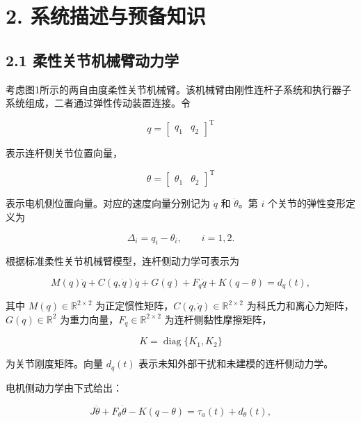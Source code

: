 \documentclass{article}
\begin{document}
\section{2. 系统描述与预备知识}

\subsection{2.1 柔性关节机械臂动力学}

考虑图1所示的两自由度柔性关节机械臂。该机械臂由刚性连杆子系统和执行器子系统组成，二者通过弹性传动装置连接。令

\begin{equation*}
q=\begin{bmatrix}q_1 & q_2\end{bmatrix}^{\mathrm T}
\end{equation*}

表示连杆侧关节位置向量，

\begin{equation*}
\theta=\begin{bmatrix}\theta_1 & \theta_2\end{bmatrix}^{\mathrm T}
\end{equation*}

表示电机侧位置向量。对应的速度向量分别记为 $\dot q$ 和 $\dot\theta$。第 $i$ 个关节的弹性变形定义为

\begin{equation*}
\Delta_i=q_i-\theta_i,\qquad i=1,2.
\end{equation*}

根据标准柔性关节机械臂模型，连杆侧动力学可表示为

\begin{equation}
M(q)\ddot q+C(q,\dot q)\dot q+G(q)+F_q\dot q+K(q-\theta)=d_q(t), \tag{1}
\end{equation}

其中 $M(q)\in\mathbb{R}^{2\times 2}$ 为正定惯性矩阵，$C(q,\dot q)\in\mathbb{R}^{2\times 2}$ 为科氏力和离心力矩阵，$G(q)\in\mathbb{R}^{2}$ 为重力向量，$F_q\in\mathbb{R}^{2\times 2}$ 为连杆侧黏性摩擦矩阵，

\begin{equation*}
K=\operatorname{diag}\{K_1,K_2\}
\end{equation*}

为关节刚度矩阵。向量 $d_q(t)$ 表示未知外部干扰和未建模的连杆侧动力学。

电机侧动力学由下式给出：

\begin{equation}
J\ddot\theta+F_\theta\dot\theta-K(q-\theta)=\tau_a(t)+d_\theta(t), \tag{2}
\end{equation}
\end{document}
